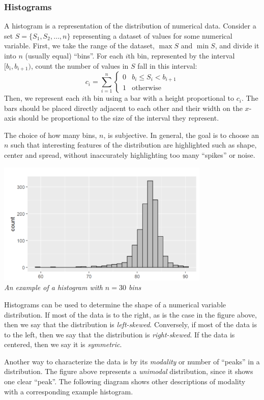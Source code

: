 \documentclass[10pt]{article}
\newcommand{\spacer}[0]{\par\vspace{0.1in}}
\begin{document}
\subsubsection{Histograms}
A histogram is a representation of the distribution of numerical data. Consider a set $S=\{S_1,S_2,\dots,n\}$ representing a dataset of values for some numerical variable. First, we take the range of the dataset, $\max S$ and $\min S$, and divide it into $n$ (usually equal) ``bins''. For each $i$th bin, represented by the interval $[b_i,b_{i+1})$, count the number of values in $S$ fall in this interval:
$$
    c_i=\sum_{i=1}^n \begin{cases}0&b_i\leq S_i < b_{i+1}\\ 1&\text{otherwise}\end{cases}
$$
Then, we represent each $i$th bin using a bar with a height proportional to $c_i$. The bars should be placed directly adjacent to each other and their width on the $x$-axis should be proportional to the size of the interval they represent.
\spacer
The choice of how many bins, $n$, is subjective. In general, the goal is to choose an $n$ such that interesting features of the distribution are highlighted such as shape, center and spread, without inaccurately highlighting too many ``spikes'' or noise.
\begin{center}
    \includegraphics[width=4in]{images/hist1.png} \\
    {\small\textit{An example of a histogram with $n=30$ bins}}
\end{center}
Histograms can be used to determine the shape of a numerical variable distribution. If most of the data is to the right, as is the case in the figure above, then we say that the distribution is \textit{left-skewed}. Conversely, if most of the data is to the left, then we say that the distribution is \textit{right-skewed}. If the data is centered, then we say it is \textit{symmetric}.
\spacer
Another way to characterize the data is by its \textit{modality} or number of ``peaks'' in a distribution. The figure above represents a \textit{unimodal} distribution, since it shows one clear ``peak''. The following diagram shows other descriptions of modality with a corresponding example histogram.
\end{document}
